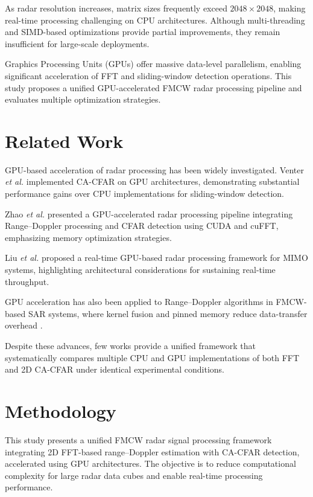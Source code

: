\documentclass[conference, a4paper]{IEEEtran}
\begin{document}
As radar resolution increases, matrix sizes frequently exceed $2048 \times 2048$, making real-time processing challenging on CPU architectures. Although multi-threading and SIMD-based optimizations provide partial improvements, they remain insufficient for large-scale deployments. 

Graphics Processing Units (GPUs) offer massive data-level parallelism, enabling significant acceleration of FFT and sliding-window detection operations. This study proposes a unified GPU-accelerated FMCW radar processing pipeline and evaluates multiple optimization strategies.

\section{Related Work}

GPU-based acceleration of radar processing has been widely investigated. 
Venter \textit{et al.} \cite{venter2011} implemented CA-CFAR on GPU architectures, demonstrating substantial performance gains over CPU implementations for sliding-window detection.

Zhao \textit{et al.} \cite{zhao2023} presented a GPU-accelerated radar processing pipeline integrating Range–Doppler processing and CFAR detection using CUDA and cuFFT, emphasizing memory optimization strategies.

Liu \textit{et al.} \cite{liu2023} proposed a real-time GPU-based radar processing framework for MIMO systems, highlighting architectural considerations for sustaining real-time throughput.

GPU acceleration has also been applied to Range–Doppler algorithms in FMCW-based SAR systems, where kernel fusion and pinned memory reduce data-transfer overhead \cite{jung2023}.

Despite these advances, few works provide a unified framework that systematically compares multiple CPU and GPU implementations of both FFT and 2D CA-CFAR under identical experimental conditions.
\section{Methodology}

This study presents a unified FMCW radar signal processing framework integrating 2D FFT-based range–Doppler estimation with CA-CFAR detection, accelerated using GPU architectures. The objective is to reduce computational complexity for large radar data cubes and enable real-time processing performance.
\end{document}
